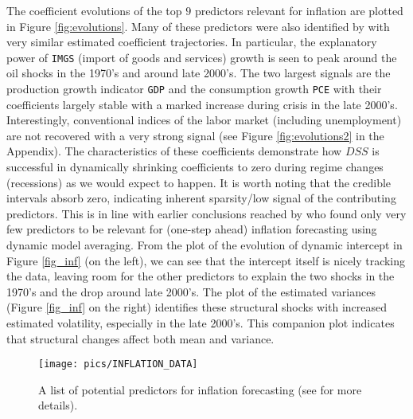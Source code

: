 \documentclass[ba]{imsart}
\numberwithin{equation}{section}
\theoremstyle{plain}
\begin{document}
{The coefficient evolutions of the top $9$ predictors relevant for inflation are plotted in Figure  \ref{fig:evolutions}. Many of these predictors were also identified by \cite{kalli_griffin} with very similar estimated coefficient trajectories.
In particular, the explanatory power of \texttt{IMGS} (import of goods and services) growth is seen to peak around the oil shocks in the 1970's and around late 2000's. 
The two largest signals are the production growth indicator \texttt{GDP} and the consumption growth \texttt{PCE} with their coefficients largely stable with a marked increase during crisis in the late 2000's.
Interestingly, conventional indices of the labor market (including unemployment) are not recovered  with  a very strong signal (see Figure \ref{fig:evolutions2} in the Appendix).
The characteristics of these coefficients demonstrate how $DSS$ is successful in dynamically shrinking coefficients to zero during regime changes (recessions) as we would expect to happen. 
It is worth noting that the credible intervals absorb zero, indicating inherent sparsity/low signal of the contributing predictors. This is in line with earlier conclusions reached by \cite{KoopKorobilis2012} who found only very
 few predictors to be  relevant for (one-step ahead) inflation forecasting using dynamic model averaging.  From the plot of the evolution of dynamic intercept in Figure \ref{fig_inf} (on the left), we can see that the intercept itself is nicely tracking the data, leaving room for the other predictors to explain the two shocks in the 1970's and the drop around late 2000's. The plot of the estimated variances (Figure \ref{fig_inf} on the right) 
 identifies these structural shocks with increased estimated volatility, especially in the late 2000's. This companion plot indicates that structural changes affect both mean and variance.
 


 \begin{figure}[t!]
\begin{center}
\texttt{[image: pics/INFLATION\_DATA]}
\end{center}
\caption{A list of potential predictors for inflation forecasting (see \cite{kalli_griffin} for more details).}\label{inflation_data}
\end{figure}



}
\end{document}
